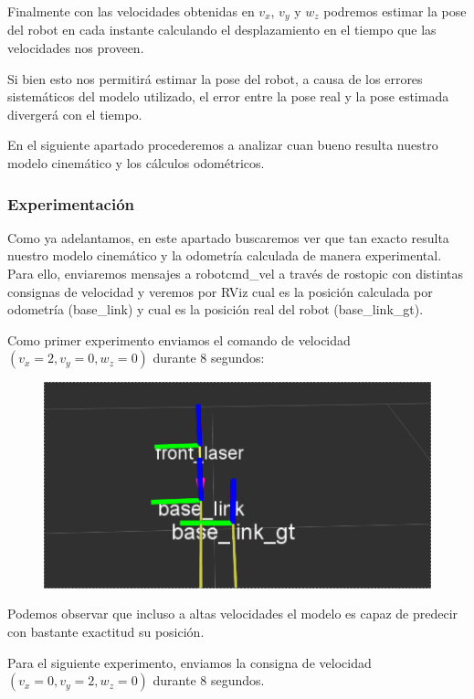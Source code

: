 Finalmente con las velocidades obtenidas en $v_x$, $v_y$ y $w_z$ podremos estimar la pose del robot en cada instante calculando el desplazamiento en el tiempo que las velocidades nos proveen.

Si bien esto nos permitirá estimar la pose del robot, a causa de los errores sistemáticos del modelo utilizado, el error entre la pose real y la pose estimada divergerá con el tiempo. 


En el siguiente apartado procederemos a analizar cuan bueno resulta nuestro modelo cinemático y los cálculos odométricos.

\subsubsection{Experimentación}

Como ya adelantamos, en este apartado buscaremos ver que tan exacto resulta nuestro modelo cinemático y la odometría calculada de manera experimental. Para ello, enviaremos mensajes a robot\/cmd\_vel a través de rostopic con distintas consignas de velocidad y veremos por RViz cual es la posición calculada por odometría (base\_link) y cual es la posición real del robot (base\_link\_gt). 


Como primer experimento enviamos el comando de velocidad $(v_x = 2, v_y=0, w_z=0)$ durante $8$ segundos:

\begin{figure}[!htb]
\includegraphics[width=\linewidth]{pruebasOdom/8segAdelante2.png}
\end{figure}


Podemos observar que incluso a altas velocidades el modelo es capaz de predecir con bastante exactitud su posición.

Para el siguiente experimento, enviamos la consigna de velocidad $(v_x = 0, v_y=2, w_z=0)$ durante $8$ segundos.

